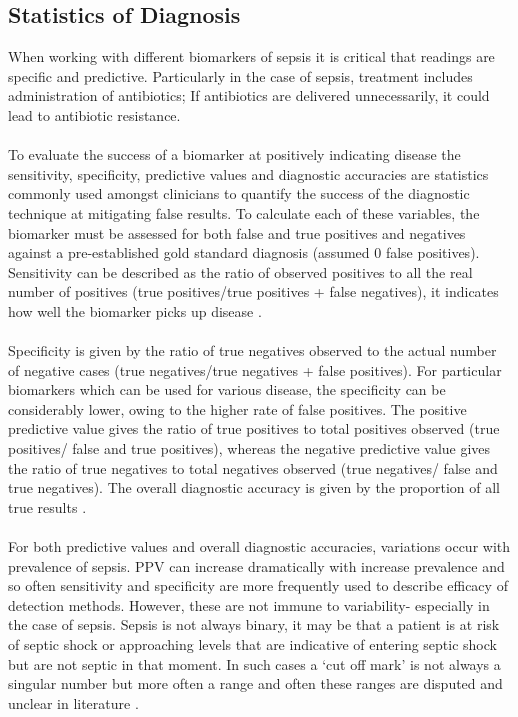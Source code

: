 \subsection{Statistics of Diagnosis}
When working with different biomarkers of sepsis it is critical that readings are specific and predictive. Particularly in the case of sepsis, treatment includes administration of antibiotics; If antibiotics are delivered unnecessarily, it could lead to antibiotic resistance.\\\\
To evaluate the success of a biomarker at positively indicating disease the sensitivity, specificity, predictive values and diagnostic accuracies are statistics commonly used amongst clinicians to quantify the success of the diagnostic technique at mitigating false results. To calculate each of these variables, the biomarker must be assessed for both false and true positives and negatives against a pre-established gold standard diagnosis (assumed 0 false positives). Sensitivity can be described as the ratio of observed positives to all the real number of positives (true positives/true positives + false negatives), it indicates how well the biomarker picks up disease \cite{kazmierczak1999statistical}. \\\\
Specificity is given by the ratio of true negatives observed to the actual number of negative cases (true negatives/true negatives + false positives). For particular biomarkers which can be used for various disease, the specificity can be considerably lower, owing to the higher rate of false positives. The positive predictive value gives the ratio of true positives to total positives observed (true positives/ false and true positives), whereas the negative predictive value gives the ratio of true negatives to total negatives observed (true negatives/ false and true negatives).  The overall diagnostic accuracy is given by the proportion of all true results \cite{christenson2007evidence}.\\\\
For both predictive values and overall diagnostic accuracies, variations occur with prevalence of sepsis. PPV can increase dramatically with increase prevalence and so often sensitivity and specificity are more frequently used to describe efficacy of detection methods. However, these are not immune to variability- especially in the case of sepsis. Sepsis is not always binary, it may be that a patient is at risk of septic shock or approaching levels that are indicative of entering septic shock but are not septic in that moment. In such cases a ‘cut off mark’ is not always a singular number but more often a range and often these ranges are disputed and unclear in literature \cite{xia2013translational}. \\\\
